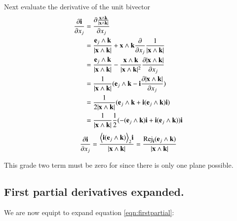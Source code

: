 \documentclass{article}      %
\newcommand{\dxj}[2] {\frac {\partial {#1}} {\partial {x_{#2}}}}
\DeclareMathOperator{\Rej}{Rej}
\newcommand{\gpgrade}[2] {{\left\langle{{#1}}\right\rangle}_{#2}}
\newcommand{\gpgradetwo}[1] {\gpgrade{#1}{2}}
\begin{document}
Next evaluate the derivative of the unit bivector
\begin{align*}
\dxj{\Bi}{j}
&= \dxj{ \frac{\Bx \wedge \Bk}{\abs{\Bx \wedge \Bk}} }{j} \\
&= \frac{\Be_j \wedge \Bk}{ \abs{\Bx \wedge \Bk} } + {\Bx \wedge \Bk} \dxj{}{j} \inv{\abs{\Bx \wedge \Bk}} \\
&= \frac{\Be_j \wedge \Bk}{\abs{\Bx \wedge \Bk}} 
 - \frac{\Bx \wedge \Bk}{ \abs{\Bx \wedge \Bk}^2 } \dxj{\abs{\Bx \wedge \Bk}}{j} \\
&= \inv{\abs{\Bx \wedge \Bk}} ( \Be_j \wedge \Bk - \Bi\dxj{\abs{\Bx \wedge \Bk}}{j}) \\
&= \inv{2 \abs{\Bx \wedge \Bk}} ( \Be_j \wedge \Bk + \Bi (\Be_j \wedge \Bk) \Bi ) \\
&= \inv{\abs{\Bx \wedge \Bk}} \inv{2}( - (\Be_j \wedge \Bk) \Bi + \Bi (\Be_j \wedge \Bk) ) \Bi \\
\end{align*}
\begin{equation}\label{eqn:ipartial} \dxj{\Bi}{j}
= \frac{\gpgradetwo{\Bi (\Be_j \wedge \Bk)} \Bi}{\abs{\Bx \wedge \Bk}} 
= \frac{\Rej_{\Bi}(\Be_j \wedge \Bk)}{\abs{\Bx \wedge \Bk}}
\end{equation}

This grade two term must be zero for  since there is only one plane possible.

%

\subsection{ First partial derivatives expanded. }

We are now equipt to expand equation \ref{eqn:firstpartial}:
\end{document}
